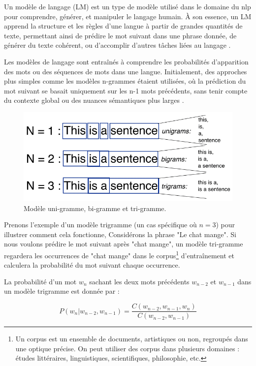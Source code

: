 Un modèle de langage (LM) est un type de modèle utilisé dans le domaine du \ac{nlp} pour comprendre, générer, et manipuler le langage humain. À son essence, un LM apprend la structure et les règles d'une langue à partir de grandes quantités de texte, permettant ainsi de prédire le mot suivant dans une phrase donnée, de générer du texte cohérent, ou d'accomplir d'autres tâches liées au langage \cite{Jurafsky2009}. 

Les modèles de langage sont entraînés à comprendre les probabilités d'apparition des mots ou des séquences de mots dans une langue. Initialement, des approches plus simples comme les modèles n-grammes étaient utilisées, où la prédiction du mot suivant se basait uniquement sur les n-1 mots précédents, sans tenir compte du contexte global ou des nuances sémantiques plus larges \cite{Jurafsky2009, Agarwal}.

\begin{figure}[H]
    \centering
    \includegraphics[width=12cm]{gfx/fig-n-gram.png}
    \caption{Modèle uni-gramme, bi-gramme et tri-gramme. \cite{Agarwal}}
    \label{fig:n-gram}
\end{figure}

Prenons l'exemple d'un modèle trigramme (un cas spécifique où $n = 3$) pour illustrer comment cela fonctionne, Considérons la phrase "Le chat mange". Si nous voulons prédire le mot suivant après "chat mange", un modèle tri-gramme regardera les occurrences de "chat mange" dans le corpus\footnote{Un corpus est un ensemble de documents, artistiques ou non, regroupés dans une optique précise. On peut utiliser des corpus dans plusieurs domaines : études littéraires, linguistiques, scientifiques, philosophie, etc.} d'entraînement et calculera la probabilité du mot suivant chaque occurrence.

La probabilité d'un mot \(w_n\) sachant les deux mots précédents \(w_{n-2}\) et \(w_{n-1}\) dans un modèle trigramme est donnée par : 

\begin{equation}
    P(w_n | w_{n-2}, w_{n-1}) = \frac{C(w_{n-2}, w_{n-1}, w_n)}{C(w_{n-2}, w_{n-1})}
\end{equation}

